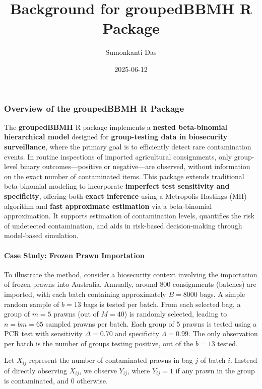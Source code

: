 \documentclass[
]{article}
\title{Background for groupedBBMH R Package}
\author{Sumonkanti Das}
\date{2025-06-12}
\begin{document}
\maketitle

\subsubsection{\texorpdfstring{Overview of the \textbf{groupedBBMH} R
Package}{Overview of the groupedBBMH R Package}}\label{overview-of-the-groupedbbmh-r-package}

The \textbf{groupedBBMH} R package implements a \textbf{nested
beta-binomial hierarchical model} designed for \textbf{group-testing
data in biosecurity surveillance}, where the primary goal is to
efficiently detect rare contamination events. In routine inspections of
imported agricultural consignments, only group-level binary
outcomes---positive or negative---are observed, without information on
the exact number of contaminated items. This package extends traditional
beta-binomial modeling to incorporate \textbf{imperfect test sensitivity
and specificity}, offering both \textbf{exact inference} using a
Metropolis-Hastings (MH) algorithm and \textbf{fast approximate
estimation} via a beta-binomial approximation. It supports estimation of
contamination levels, quantifies the risk of undetected contamination,
and aids in risk-based decision-making through model-based simulation.

\paragraph{Case Study: Frozen Prawn
Importation}\label{case-study-frozen-prawn-importation}

To illustrate the method, consider a biosecurity context involving the
importation of frozen prawns into Australia. Annually, around 800
consignments (batches) are imported, with each batch containing
approximately \(B = 8000\) bags. A simple random sample of \(b = 13\)
bags is tested per batch. From each selected bag, a group of \(m = 5\)
prawns (out of \(M = 40\)) is randomly selected, leading to
\(n = bm = 65\) sampled prawns per batch. Each group of 5 prawns is
tested using a PCR test with sensitivity \(\Delta = 0.70\) and
specificity \(\Lambda = 0.99\). The only observation per batch is the
number of groups testing positive, out of the \(b=13\) tested.

Let \(X_{ij}\) represent the number of contaminated prawns in bag \(j\)
of batch \(i\). Instead of directly observing \(X_{ij}\), we observe
\(Y_{ij}\), where \(Y_{ij} = 1\) if any prawn in the group is
contaminated, and 0 otherwise.
\end{document}
